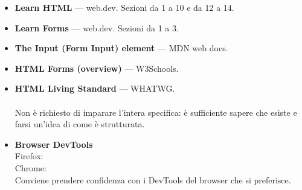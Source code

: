 \begin{itemize}
  \item \textbf{Learn HTML} --- web.dev. Sezioni da 1 a 10 e da 12 a 14. \\
  \item \textbf{Learn Forms} --- web.dev. Sezioni da 1 a 3. \\
  \item \textbf{The Input (Form Input) element} --- MDN web docs. \\
  \item \textbf{HTML Forms (overview)} --- W3Schools. \\
  \item \textbf{HTML Living Standard} --- WHATWG. \\
         \\
        Non è richiesto di imparare l'intera specifica: è sufficiente sapere che
        esiste e farsi un'idea di come è strutturata.
  \item \textbf{Browser DevTools} \\
        Firefox:  \\
        Chrome:  \\
        Conviene prendere confidenza con i DevTools del browser che si preferisce.
\end{itemize}
